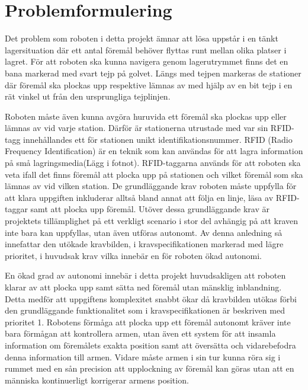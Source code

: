 

\section{Problemformulering}

Det problem som roboten i detta projekt ämnar att lösa uppstår i en tänkt lagersituation där ett antal föremål behöver flyttas runt mellan olika platser i lagret. För att roboten ska kunna navigera genom lagerutrymmet finns det en bana markerad med svart tejp på golvet. Längs med tejpen markeras de stationer där föremål ska plockas upp respektive lämnas av med hjälp av en bit tejp i en rät vinkel ut från den ursprungliga tejplinjen.


Roboten måste även kunna avgöra huruvida ett föremål ska plockas upp eller lämnas av vid varje station. Därför är stationerna utrustade med var sin RFID-tagg innehållandes ett för stationen unikt identifikationsnummer. RFID (Radio Frequency Identification) är en teknik som kan användas för att lagra information på små lagringsmedia(Lägg i fotnot). RFID-taggarna används för att roboten ska veta ifall det finns föremål att plocka upp på stationen och vilket föremål som ska lämnas av vid vilken station.
De grundläggande krav roboten måste uppfylla för att klara uppgiften inkluderar alltså bland annat att följa en linje, läsa av RFID-taggar samt att plocka upp föremål. Utöver dessa grundläggande krav är projektets tillämplighet på ett verkligt scenario i stor del avhängig på att kraven inte bara kan uppfyllas, utan även utföras autonomt. Av denna anledning så innefattar den utökade kravbilden, i kravspecifikationen markerad med lägre prioritet, i huvudsak krav vilka innebär en för roboten ökad autonomi.

En ökad grad av autonomi innebär i detta projekt huvudsakligen att roboten klarar av att plocka upp samt sätta ned föremål utan mänsklig inblandning. Detta medför att uppgiftens komplexitet snabbt ökar då kravbilden utökas förbi den grundläggande funktionalitet som i kravspecifikationen är beskriven med prioritet 1. Robotens förmåga att plocka upp ett föremål autonomt kräver inte bara förmågan att kontrollera armen, utan även ett system för att insamla information om föremålets exakta position samt att översätta och vidarebefodra denna information till armen. Vidare måste armen i sin tur kunna röra sig i rummet med en sån precision att upplockning av föremål kan göras utan att en människa kontinuerligt korrigerar armens position.
